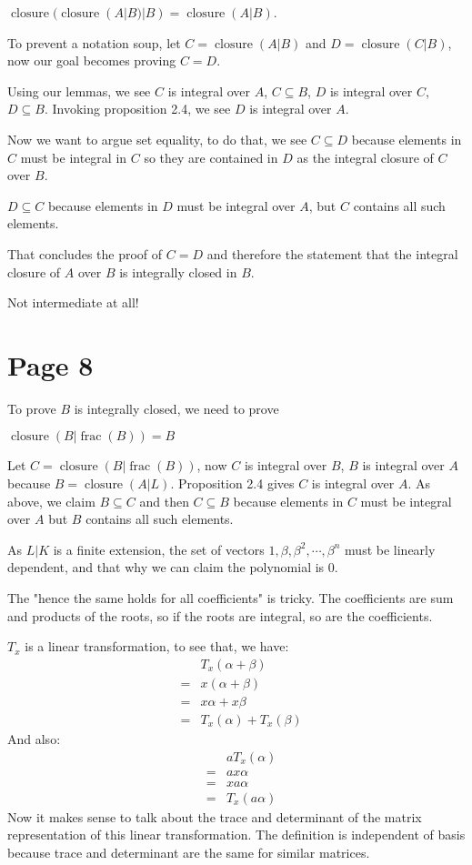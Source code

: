 \documentclass{article}
\DeclareMathOperator{\fractionfield}{frac}
\DeclareMathOperator{\closure}{closure}
\begin{document}
$ \closure(\closure(A | B) | B) = \closure(A | B) $.

To prevent a notation soup, let $ C = \closure(A | B) $ and $ D = \closure(C | B) $, now our goal becomes proving $ C = D $.

Using our lemmas, we see $ C $ is integral over $ A $, $ C \subseteq B $, $ D $ is integral over $ C $, $ D \subseteq B $. Invoking proposition 2.4, we see $ D $ is integral over $ A $.

Now we want to argue set equality, to do that, we see 
$ C \subseteq D $ because elements in $ C $ must be integral in $ C $ so they are contained in $ D $ as the integral closure of $ C $ over $ B $.

$ D \subseteq C $ because elements in $ D $ must be integral over $ A $, but $ C $ contains all such elements.

That concludes the proof of $ C = D $ and therefore the statement that the integral closure of $ A $ over $ B $ is integrally closed in $ B $.

Not intermediate at all!

\section*{Page 8}
To prove $ B $ is integrally closed, we need to prove

$ \closure(B|\fractionfield(B)) = B $

Let $ C = \closure(B|\fractionfield(B)) $, now $ C $ is integral over $ B $, $ B $ is integral over $ A $ because $ B = \closure(A|L) $. Proposition 2.4 gives $ C $ is integral over $ A $. As above, we claim $ B \subseteq C $ and then $ C \subseteq B $ because elements in $ C$ must be integral over $ A $ but $ B $ contains all such elements.

As $ L | K $ is a finite extension, the set of vectors $ 1, \beta, \beta^2, \cdots, \beta^n $ must be linearly dependent, and that why we can claim the polynomial is 0.

The "hence the same holds for all coefficients" is tricky. The coefficients are sum and products of the roots, so if the roots are integral, so are the coefficients.

$ T_x $ is a linear transformation, to see that, we have:
\begin{eqnarray*}
  & & T_x(\alpha + \beta) \\
  &=& x(\alpha + \beta)   \\
  &=& x\alpha + x\beta    \\
  &=& T_x(\alpha) + T_x(\beta)
\end{eqnarray*}
And also:
\begin{eqnarray*}
  & & a T_x(\alpha) \\
  &=& ax\alpha      \\
  &=& xa\alpha      \\
  &=& T_x(a\alpha)
\end{eqnarray*}
Now it makes sense to talk about the trace and determinant of the matrix representation of this linear transformation. The definition is independent of basis because trace and determinant are the same for similar matrices.
\end{document}
